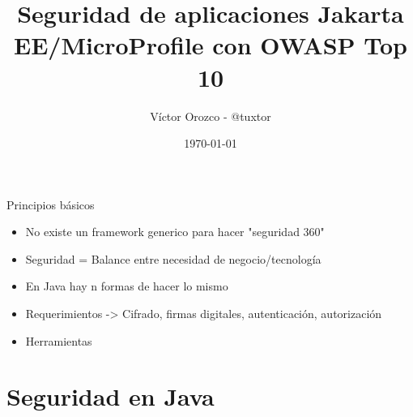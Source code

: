 \documentclass[aspectratio=169]{beamer}
\title{Seguridad de aplicaciones Jakarta EE/MicroProfile con OWASP Top 10}
\author{Víctor Orozco - @tuxtor}
\institute{Academik}
\date{\today}
\begin{document}
{
    \frame{\titlepage}
}

\begin{frame}{Principios básicos}
	\begin{itemize}
	\item No existe un framework generico para hacer "seguridad 360"
	\item Seguridad = Balance entre necesidad de negocio/tecnología
	\item En Java hay n formas de hacer lo mismo
	\item Requerimientos -> Cifrado, firmas digitales, autenticación, autorización
	\item Herramientas
\end{itemize}
\end{frame}



{
    \section{Seguridad en Java}
}
\end{document}
